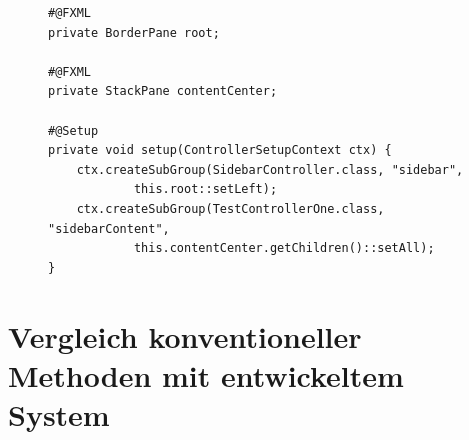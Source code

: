 \begin{figure}[H]
	\begin{lstlisting}[caption=Demo -- Subgruppen Einrichtung., captionpos=b, label=lst:mainmenu_controller_setup]
#@FXML
private BorderPane root;

#@FXML
private StackPane contentCenter;

#@Setup
private void setup(ControllerSetupContext ctx) {
    ctx.createSubGroup(SidebarController.class, "sidebar",
			this.root::setLeft);
    ctx.createSubGroup(TestControllerOne.class, "sidebarContent",
			this.contentCenter.getChildren()::setAll);
}
	\end{lstlisting}
\end{figure}
\section{Vergleich konventioneller Methoden mit entwickeltem System}
\label{vergleich_system_javafx}

